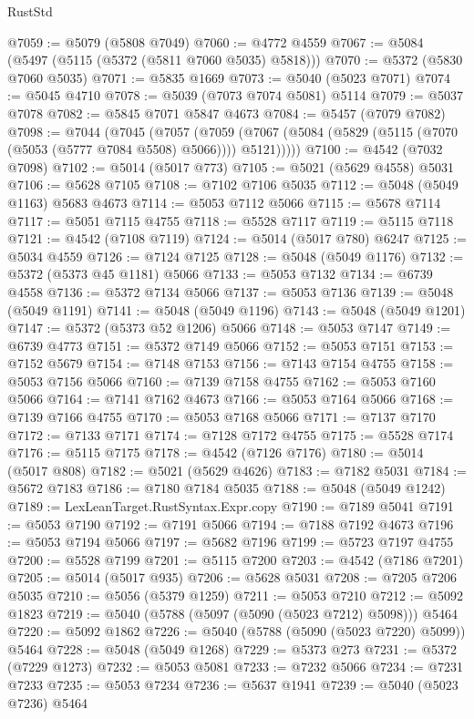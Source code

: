 \begin{lexlean}{RustStd}
\begin{coremodule}
@7059 := @5079 (@5808 @7049)
@7060 := @4772 @4559
@7067 := @5084 (@5497 (@5115 (@5372 (@5811 @7060 @5035) @5818)))
@7070 := @5372 (@5830 @7060 @5035)
@7071 := @5835 @1669
@7073 := @5040 (@5023 @7071)
@7074 := @5045 @4710
@7078 := @5039 (@7073 @7074 @5081) @5114
@7079 := @5037 @7078
@7082 := @5845 @7071 @5847 @4673
@7084 := @5457 (@7079 @7082)
@7098 := @7044
    (@7045
      (@7057
        (@7059 (@7067 (@5084 (@5829 (@5115 (@7070 (@5053 (@5777 @7084 @5508) @5066)))) @5121)))))
@7100 := @4542 (@7032 @7098)
@7102 := @5014 (@5017 @773)
@7105 := @5021 (@5629 @4558) @5031
@7106 := @5628 @7105
@7108 := @7102 @7106 @5035
@7112 := @5048 (@5049 @1163) @5683 @4673
@7114 := @5053 @7112 @5066
@7115 := @5678 @7114
@7117 := @5051 @7115 @4755
@7118 := @5528 @7117
@7119 := @5115 @7118
@7121 := @4542 (@7108 @7119)
@7124 := @5014 (@5017 @780) @6247
@7125 := @5034 @4559
@7126 := @7124 @7125
@7128 := @5048 (@5049 @1176)
@7132 := @5372 (@5373 @45 @1181) @5066
@7133 := @5053 @7132
@7134 := @6739 @4558
@7136 := @5372 @7134 @5066
@7137 := @5053 @7136
@7139 := @5048 (@5049 @1191)
@7141 := @5048 (@5049 @1196)
@7143 := @5048 (@5049 @1201)
@7147 := @5372 (@5373 @52 @1206) @5066
@7148 := @5053 @7147
@7149 := @6739 @4773
@7151 := @5372 @7149 @5066
@7152 := @5053 @7151
@7153 := @7152 @5679
@7154 := @7148 @7153
@7156 := @7143 @7154 @4755
@7158 := @5053 @7156 @5066
@7160 := @7139 @7158 @4755
@7162 := @5053 @7160 @5066
@7164 := @7141 @7162 @4673
@7166 := @5053 @7164 @5066
@7168 := @7139 @7166 @4755
@7170 := @5053 @7168 @5066
@7171 := @7137 @7170
@7172 := @7133 @7171
@7174 := @7128 @7172 @4755
@7175 := @5528 @7174
@7176 := @5115 @7175
@7178 := @4542 (@7126 @7176)
@7180 := @5014 (@5017 @808)
@7182 := @5021 (@5629 @4626)
@7183 := @7182 @5031
@7184 := @5672 @7183
@7186 := @7180 @7184 @5035
@7188 := @5048 (@5049 @1242)
@7189 := LexLeanTarget.RustSyntax.Expr.copy
@7190 := @7189 @5041
@7191 := @5053 @7190
@7192 := @7191 @5066
@7194 := @7188 @7192 @4673
@7196 := @5053 @7194 @5066
@7197 := @5682 @7196
@7199 := @5723 @7197 @4755
@7200 := @5528 @7199
@7201 := @5115 @7200
@7203 := @4542 (@7186 @7201)
@7205 := @5014 (@5017 @935)
@7206 := @5628 @5031
@7208 := @7205 @7206 @5035
@7210 := @5056 (@5379 @1259)
@7211 := @5053 @7210
@7212 := @5092 @1823
@7219 := @5040 (@5788 (@5097 (@5090 (@5023 @7212) @5098))) @5464
@7220 := @5092 @1862
@7226 := @5040 (@5788 (@5090 (@5023 @7220) @5099)) @5464
@7228 := @5048 (@5049 @1268)
@7229 := @5373 @273
@7231 := @5372 (@7229 @1273)
@7232 := @5053 @5081
@7233 := @7232 @5066
@7234 := @7231 @7233
@7235 := @5053 @7234
@7236 := @5637 @1941
@7239 := @5040 (@5023 @7236) @5464

\end{coremodule}
\end{lexlean}
